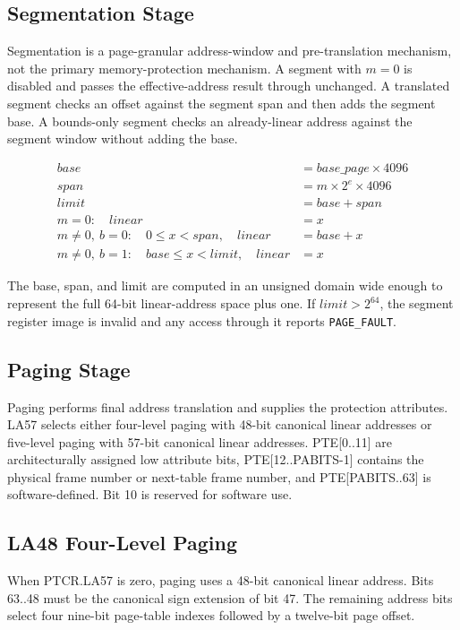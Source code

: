 \subsection{Segmentation Stage}
Segmentation is a page-granular address-window and pre-translation mechanism, not
the primary memory-protection mechanism. A segment with \(m = 0\) is disabled and
passes the effective-address result through unchanged. A translated segment checks
an offset against the segment span and then adds the segment base. A bounds-only
segment checks an already-linear address against the segment window without adding
the base.

\begin{align*}
\mathit{base} &= \mathit{base\_page} \times 4096\\
\mathit{span} &= m \times 2^e \times 4096\\
\mathit{limit} &= \mathit{base} + \mathit{span}\\
m=0:\quad \mathit{linear} &= x\\
m\ne0,\ b=0:\quad 0 \le x < \mathit{span},\quad \mathit{linear} &= \mathit{base}+x\\
m\ne0,\ b=1:\quad \mathit{base} \le x < \mathit{limit},\quad \mathit{linear} &= x
\end{align*}

The base, span, and limit are computed in an unsigned domain wide enough to
represent the full 64-bit linear-address space plus one. If
\(\mathit{limit} > 2^{64}\), the segment register image is invalid and any
access through it reports \texttt{PAGE\_FAULT}.

\subsection{Paging Stage}
Paging performs final address translation and supplies the protection attributes.
LA57 selects either four-level paging with 48-bit canonical linear addresses or
five-level paging with 57-bit canonical linear addresses. PTE[0..11] are
architecturally assigned low attribute bits, PTE[12..PABITS-1] contains the
physical frame number or next-table frame number, and PTE[PABITS..63] is
software-defined. Bit 10 is reserved for software use.

\clearpage
\subsection{LA48 Four-Level Paging}
When PTCR.LA57 is zero, paging uses a 48-bit canonical linear address. Bits
63..48 must be the canonical sign extension of bit 47. The remaining address
bits select four nine-bit page-table indexes followed by a twelve-bit page
offset.

